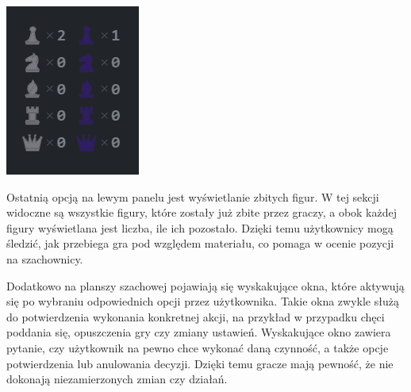 \documentclass[12pt,a4paper]{article}
\begin{document}
\begin{minipage}[t]{0.2\textwidth} 
    \vspace{0pt} 
    \centering 
    \includegraphics[width=\linewidth]{zdj/ins_min_capt.png} 
\end{minipage} 
\hfill 
\begin{minipage}[t]{0.7\textwidth} 
    \vspace{0pt} 
    \raggedright 
    Ostatnią opcją na lewym panelu jest wyświetlanie zbitych figur. W tej sekcji widoczne są wszystkie figury, które zostały już zbite przez graczy, a obok każdej figury wyświetlana jest liczba, ile ich pozostało. Dzięki temu użytkownicy mogą śledzić, jak przebiega gra pod względem materiału, co pomaga w ocenie pozycji na szachownicy.
\end{minipage}

\newpage
Dodatkowo na planszy szachowej pojawiają się wyskakujące okna, które aktywują się po wybraniu odpowiednich opcji przez użytkownika. Takie okna zwykle służą do potwierdzenia wykonania konkretnej akcji, na przykład w przypadku chęci poddania się, opuszczenia gry czy zmiany ustawień. Wyskakujące okno zawiera pytanie, czy użytkownik na pewno chce wykonać daną czynność, a także opcje potwierdzenia lub anulowania decyzji. Dzięki temu gracze mają pewność, że nie dokonają niezamierzonych zmian czy działań.
\end{document}
